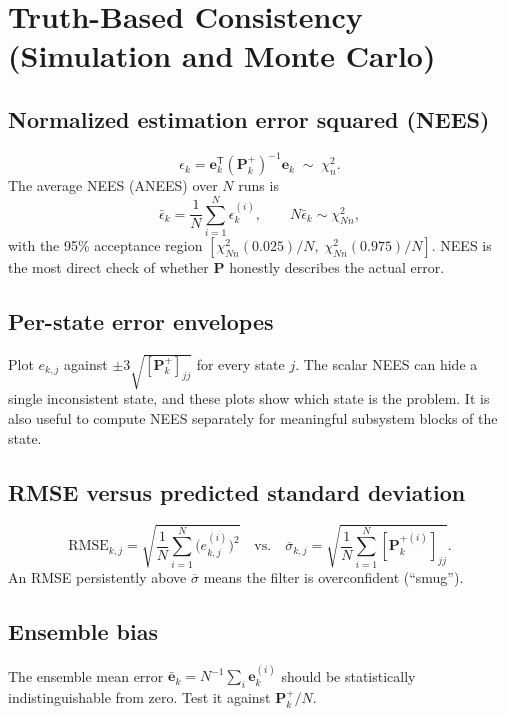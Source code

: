 \documentclass[11pt]{article}
\newcommand{\e}{\bm{e}}
\newcommand{\Pm}{\bm{P}}
\newcommand{\T}{^{\mathsf{T}}}
\newcommand{\chisq}[1]{\chi^2_{#1}}
\begin{document}
\section{Truth-Based Consistency (Simulation and Monte Carlo)}
\label{sec:truth}

\subsection{Normalized estimation error squared (NEES)}
\begin{equation}
  \epsilon_k = \e_k\T (\Pm_k^+)^{-1} \e_k \;\sim\; \chisq{n}.
\end{equation}
The average NEES (ANEES) over $N$ runs is
\begin{equation}
  \bar{\epsilon}_k = \frac{1}{N}\sum_{i=1}^{N}\epsilon_k^{(i)},
  \qquad N\bar{\epsilon}_k \sim \chisq{Nn},
\end{equation}
with the 95\% acceptance region
$\left[\chisq{Nn}(0.025)/N,\; \chisq{Nn}(0.975)/N\right]$.
NEES is the most direct check of whether $\Pm$ honestly describes the actual error.

\subsection{Per-state error envelopes}
Plot $e_{k,j}$ against $\pm 3\sqrt{[\Pm_k^+]_{jj}}$ for every state $j$. The scalar NEES
can hide a single inconsistent state, and these plots show which state is the problem.
It is also useful to compute NEES separately for meaningful subsystem blocks of the state.

\subsection{RMSE versus predicted standard deviation}
\begin{equation}
  \mathrm{RMSE}_{k,j} = \sqrt{\frac{1}{N}\sum_{i=1}^{N}\big(e_{k,j}^{(i)}\big)^2}
  \quad\text{vs.}\quad
  \overline{\sigma}_{k,j} = \sqrt{\frac{1}{N}\sum_{i=1}^{N}[\Pm_k^{+(i)}]_{jj}}.
\end{equation}
An RMSE persistently above $\overline{\sigma}$ means the filter is overconfident
(``smug'').

\subsection{Ensemble bias}
The ensemble mean error $\bar{\e}_k = N^{-1}\sum_i \e_k^{(i)}$ should be statistically
indistinguishable from zero. Test it against $\Pm_k^+/N$.
\end{document}
